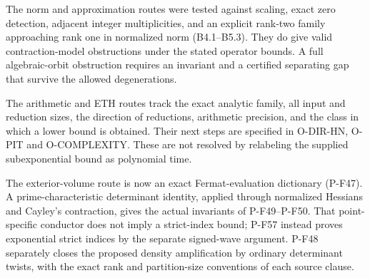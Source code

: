 The norm and approximation routes were tested against scaling, exact
zero detection, adjacent integer multiplicities, and an explicit rank-two
family approaching rank one in normalized norm (B4.1--B5.3). They do give
valid contraction-model obstructions under the stated operator bounds.
A full algebraic-orbit obstruction requires an invariant and a certified
separating gap that survive the allowed degenerations.

The arithmetic and ETH routes track the exact analytic family, all input
and reduction sizes, the direction of reductions, arithmetic precision,
and the class in which a lower bound is obtained. Their next steps are
specified in O-DIR-HN, O-PIT and O-COMPLEXITY. These are not resolved by
relabeling the supplied subexponential bound as polynomial time.

The exterior-volume route is now an exact Fermat-evaluation
dictionary (P-F47). A prime-characteristic determinant identity,
applied through normalized Hessians and Cayley's contraction,
gives the actual invariants of P-F49--P-F50. That point-specific
conductor does not imply a strict-index bound; P-F57 instead
proves exponential strict indices by the separate signed-wave
argument. P-F48 separately closes the proposed density
amplification by ordinary determinant twists, with the exact
rank and partition-size conventions of each source clause.
